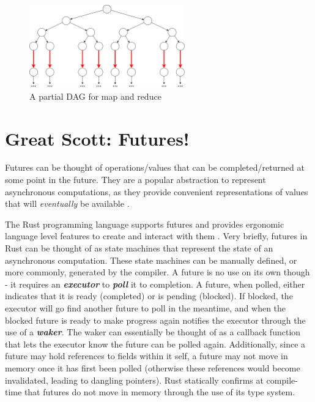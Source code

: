 \documentclass[bsc,frontabs,singlespacing,parskip,deptreport,normalheadings]{infthesis}
\begin{document}
\begin{figure}[ht]
    \centering
    \includegraphics[width=0.6\textwidth]{figures/map-reduce.png}
    \caption{A partial DAG for map and reduce}
    \label{fig:map-reduce-dag}
\end{figure}

\section{Great Scott: Futures!}
\label{section:futures}

Futures can be thought of operations/values that can be completed/returned at
some point in the future. They are a popular abstraction to represent
asynchronous computations, as they provide convenient representations of values
that will \textit{eventually} be available \cite{halstead_implementation_1984,
halstead_multilisp_1985}.

The Rust programming language supports futures and provides ergonomic language
level features to create and interact with them \cite{noauthor_future_nodate}.
Very briefly, futures in Rust can be thought of as state machines that represent
the state of an asynchronous computation. These state machines can be manually
defined, or more commonly, generated by the compiler. A future is no use on its
own though - it requires an \textit{\textbf{executor}} to \textbf{\textit{poll}}
it to completion. A future, when polled, either indicates that it is ready
(completed) or is pending (blocked). If blocked, the executor will go find
another future to poll in the meantime, and when the blocked future is ready to
make progress again notifies the executor through the use of a
\textbf{\textit{waker}}. The waker can essentially be thought of as a callback
function that lets the executor know the future can be polled again.
Additionally, since a future may hold references to fields within it self, a
future may not move in memory once it has first been polled (otherwise these
references would become invalidated, leading to dangling pointers). Rust
statically confirms at compile-time that futures do not move in memory through
the use of its type system.
\end{document}
